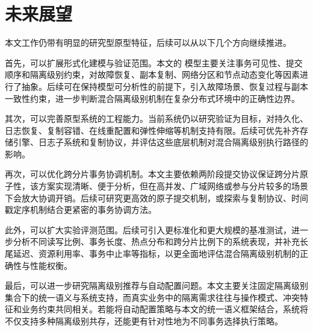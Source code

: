 \section{未来展望}

本文工作仍带有明显的研究型原型特征，后续可以从以下几个方向继续推进。

首先，可以扩展形式化建模与验证范围。本文的 \TLAPlus 模型主要关注事务可见性、提交顺序和隔离级别约束，对故障恢复、副本复制、网络分区和节点动态变化等因素进行了抽象。后续可在保持模型可分析性的前提下，引入故障场景、恢复过程与副本一致性约束，进一步判断混合隔离级别机制在复杂分布式环境中的正确性边界。

其次，可以完善原型系统的工程能力。当前系统仍以研究验证为目标，对持久化、日志恢复、复制容错、在线重配置和弹性伸缩等机制支持有限。后续可优先补齐存储引擎、日志子系统和复制协议，并评估这些底层机制对混合隔离级别执行路径的影响。

再次，可以优化跨分片事务协调机制。本文主要依赖两阶段提交协议保证跨分片原子性，该方案实现清晰、便于分析，但在高并发、广域网络或参与分片较多的场景下会放大协调开销。后续可研究更高效的原子提交机制，或探索与复制协议、时间戳定序机制结合更紧密的事务协调方法。

此外，可以扩大实验评测范围。后续可引入更标准化和更大规模的基准测试，进一步分析不同读写比例、事务长度、热点分布和跨分片比例下的系统表现，并补充长尾延迟、资源利用率、事务中止率等指标，以更全面地评估混合隔离级别机制的正确性与性能权衡。

最后，可以进一步研究隔离级别推荐与自动配置问题。本文主要关注固定隔离级别集合下的统一语义与系统支持，而真实业务中的隔离需求往往与操作模式、冲突特征和业务约束共同相关。若能将自动配置策略与本文的统一语义框架结合，系统将不仅支持多种隔离级别共存，还能更有针对性地为不同事务选择执行策略。
